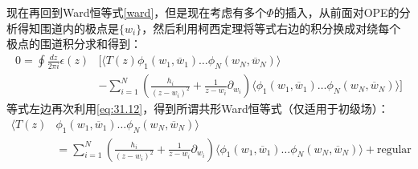 现在再回到Ward恒等式\ref{ward}，但是现在考虑有多个$\Phi$的插入，从前面对OPE的分析得知围道内的极点是$\{w_i\}$，然后利用柯西定理将等式右边的积分换成对绕每个极点的围道积分求和得到：
\begin{equation}
	\begin{aligned}0=\oint\frac{dz}{2\pi i}\epsilon(z)&\Bigg[\Big\langle T(z)\phi_1(w_1,\overline{w}_1)\ldots\phi_N(w_N,\overline{w}_N)\Big\rangle\\
		&-\sum_{i=1}^N\left(\frac{h_i}{(z-w_i)^2}+\frac{1}{z-w_i}\partial_{w_i}\right)\Big\langle\phi_1(w_1,\overline{w}_1)\ldots\phi_N(w_N,\overline{w}_N)\Big\rangle\Bigg]\end{aligned}
\end{equation}
等式左边再次利用\ref{eq:31.12}，得到所谓共形Ward恒等式（仅适用于初级场）：
\begin{equation}
	\boxed{\begin{aligned}\big\langle T\left(z\right)&\phi_{1}(w_{1},\overline{w}_{1})\ldots\phi_{N}(w_{N},\overline{w}_{N})\big\rangle\\&=\sum_{i=1}^{N}\left(\frac{h_{i}}{(z-w_{i})^{2}}+\frac{1}{z-w_{i}}\partial_{w_{i}}\right)\Big\langle\phi_{1}(w_{1},\overline{w}_{1})\ldots\phi_{N}(w_{N},\overline{w}_{N})\Big\rangle+\text{regular}\end{aligned}}
\end{equation}
